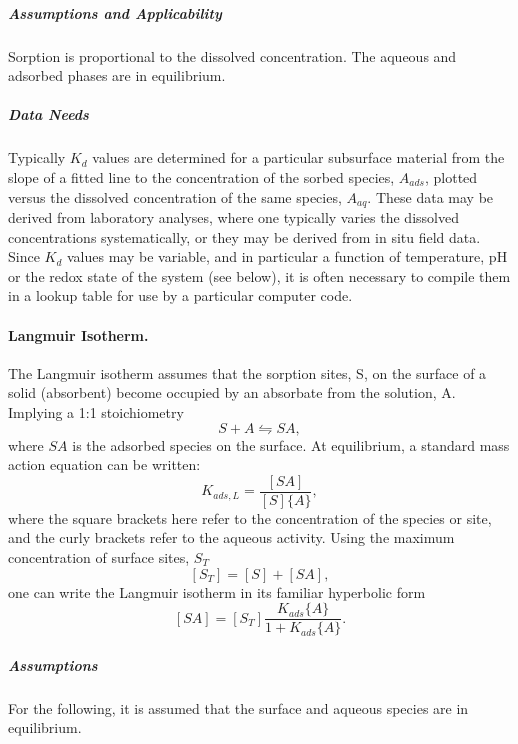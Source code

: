 \subparagraph{Assumptions and Applicability} 
Sorption is proportional to the dissolved concentration. 
The aqueous and adsorbed phases are in equilibrium.

\subparagraph{Data Needs}
Typically $K_d$ values are determined for a particular subsurface material 
from the slope of a fitted line to the concentration of the sorbed species, $A_{ads}$, 
plotted versus the dissolved concentration of the same species, $A_{aq}$.  
These data may be derived from laboratory analyses, where one typically varies the dissolved concentrations systematically, 
or they may be derived from in situ field data.  
Since $K_d$ values may be variable, and in particular a function of temperature, 
pH or the redox state of the system (see below), it is often necessary to compile them in a lookup table for use by a particular computer code.

\paragraph{Langmuir Isotherm.}
The Langmuir isotherm assumes that the sorption sites, S, on the surface of a solid (absorbent) become occupied 
by an absorbate from the solution, A.  Implying a 1:1 stoichiometry
%
\begin{equation}  \label{eq:langmuir} 
  S + A \leftrightharpoons SA,
\end{equation}
where $SA$ is the adsorbed species on the surface. At equilibrium, a
standard mass action equation can be written:
%
\begin{equation}  \label{eq:langmuir_massaction}
  K_{ads,L} = \frac{ [ SA ] }{ [S] \{A\} },
\end{equation}
where the square brackets here refer to the concentration of the
species or site, and the curly brackets refer to the aqueous
activity.  Using the maximum concentration of surface sites, $S_T$
%
\begin{equation}  \label{eq:totalsurfacesites}
  [S_T] = [S] + [SA],
\end{equation}
one can write the Langmuir isotherm in its familiar hyperbolic form
%
\begin{equation}  \label{eq:hyperbolicLangmuir}
  [SA] = [S_T] \frac{ K_{ads} \{A\} }{1 + K_{ads} \{A\} }.
\end{equation}

\subparagraph{Assumptions} 
For the following, it is assumed that the surface and aqueous species are in equilibrium.

